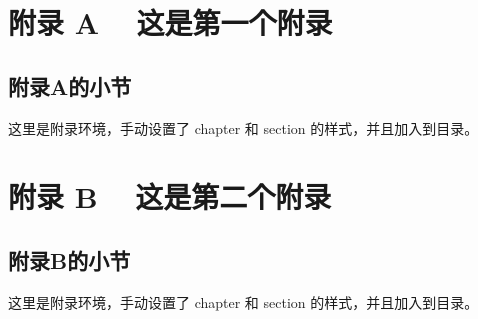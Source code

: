 \documentclass{shnuthesis}
\begin{document}
\appendix
\renewcommand{\chaptermark}[1]{\markboth{#1}{}}
\chapter{附录 A ~ 这是第一个附录}
\renewcommand{\thesection}{A.\arabic{section}}
\section{附录A的小节}

这里是附录环境，手动设置了 chapter 和 section 的样式，并且加入到目录。

\chapter{附录 B ~ 这是第二个附录}
\renewcommand{\thesection}{B.\arabic{section}}
\section{附录B的小节}

这里是附录环境，手动设置了 chapter 和 section 的样式，并且加入到目录。
\end{document}
